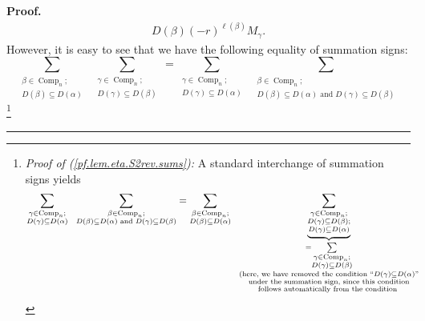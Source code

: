 \documentclass[numbers=enddot,12pt,final,onecolumn,notitlepage]{scrartcl}%
\theoremstyle{definition}
\newenvironment{proof}[1][Proof]{\noindent\textbf{#1.} }{\ \rule{0.5em}{0.5em}}
\let\sumnonlimits\sum
\renewcommand{\sum}{\sumnonlimits\limits}
\newenvironment{verlong}{}{}
\begin{document}
\begin{verlong}
\begin{proof}
\begin{align}
{{D\left(  \beta\right)  }}\left(  -r\right)  ^{\ell\left(  \beta\right)
}M_{\gamma}. \label{pf.lem.eta.S2rev.LHS1}%
\end{align}
However, it is easy to see that we have the following equality of summation
signs:%
\begin{equation}
\sum_{\substack{\beta\in\operatorname*{Comp}\nolimits_{n};\\D\left(
\beta\right)  \subseteq D\left(  \alpha\right)  }}\ \ \sum_{\substack{\gamma
\in\operatorname*{Comp}\nolimits_{n};\\D\left(  \gamma\right)  \subseteq
D\left(  \beta\right)  }}=\sum_{\substack{\gamma\in\operatorname*{Comp}%
\nolimits_{n};\\D\left(  \gamma\right)  \subseteq D\left(  \alpha\right)
}}\ \ \sum_{\substack{\beta\in\operatorname*{Comp}\nolimits_{n};\\D\left(
\beta\right)  \subseteq D\left(  \alpha\right)  \text{ and }D\left(
\gamma\right)  \subseteq D\left(  \beta\right)  }}
\label{pf.lem.eta.S2rev.sums}%
\end{equation}
\footnote{\textit{Proof of (\ref{pf.lem.eta.S2rev.sums}):} A standard
interchange of summation signs yields%
\begin{align*}
\sum_{\substack{\gamma\in\operatorname*{Comp}\nolimits_{n};\\D\left(
\gamma\right)  \subseteq D\left(  \alpha\right)  }}\ \ \sum_{\substack{\beta
\in\operatorname*{Comp}\nolimits_{n};\\D\left(  \beta\right)  \subseteq
D\left(  \alpha\right)  \text{ and }D\left(  \gamma\right)  \subseteq D\left(
\beta\right)  }}  &  =\sum_{\substack{\beta\in\operatorname*{Comp}%
\nolimits_{n};\\D\left(  \beta\right)  \subseteq D\left(  \alpha\right)
}}\ \ \underbrace{\sum_{\substack{\gamma\in\operatorname*{Comp}\nolimits_{n}%
;\\D\left(  \gamma\right)  \subseteq D\left(  \beta\right)  ;\\D\left(
\gamma\right)  \subseteq D\left(  \alpha\right)  }}}_{\substack{=\sum
_{\substack{\gamma\in\operatorname*{Comp}\nolimits_{n};\\D\left(
\gamma\right)  \subseteq D\left(  \beta\right)  }}\\\text{(here, we have
removed the condition \textquotedblleft}D\left(  \gamma\right)  \subseteq
D\left(  \alpha\right)  \text{\textquotedblright}\\\text{under the summation
sign, since this condition}\\\text{follows automatically from the condition
}}}
\end{align*}}
\end{proof}
\end{verlong}
\end{document}
